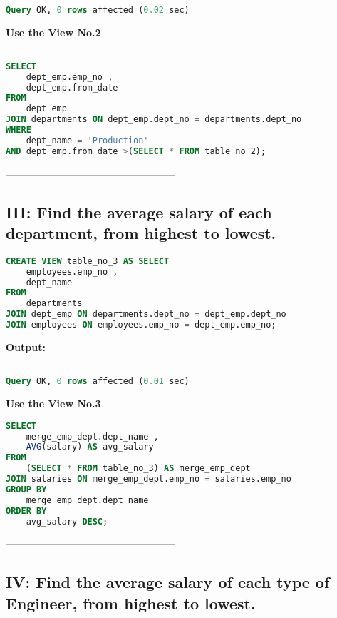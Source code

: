 \documentclass[12pt]{report}
\begin{document}
\begin{lstlisting}[language=sql]

Query OK, 0 rows affected (0.02 sec)

\end{lstlisting}

\textbf{Use the View No.2}
\begin{lstlisting}[language=sql]

SELECT
	dept_emp.emp_no ,
	dept_emp.from_date
FROM
	dept_emp
JOIN departments ON dept_emp.dept_no = departments.dept_no
WHERE
	dept_name = 'Production'
AND dept_emp.from_date >(SELECT * FROM table_no_2);

\end{lstlisting}

---------------------------------------------------


\subsection*{III: Find the average salary of each department, from highest to lowest.}

\begin{lstlisting}[language=sql]
CREATE VIEW table_no_3 AS SELECT
	employees.emp_no ,
	dept_name
FROM
	departments
JOIN dept_emp ON departments.dept_no = dept_emp.dept_no
JOIN employees ON employees.emp_no = dept_emp.emp_no;
\end{lstlisting}


\textbf{Output:}
\begin{lstlisting}[language=sql]

Query OK, 0 rows affected (0.01 sec)

\end{lstlisting}

\textbf{Use the View No.3}
\begin{lstlisting}[language=sql]
SELECT
	merge_emp_dept.dept_name ,
	AVG(salary) AS avg_salary
FROM
	(SELECT * FROM table_no_3) AS merge_emp_dept
JOIN salaries ON merge_emp_dept.emp_no = salaries.emp_no
GROUP BY
	merge_emp_dept.dept_name
ORDER BY
	avg_salary DESC;
\end{lstlisting}

---------------------------------------------------

\subsection*{IV: Find the average salary of each type of Engineer, from highest to lowest.}
\end{document}
